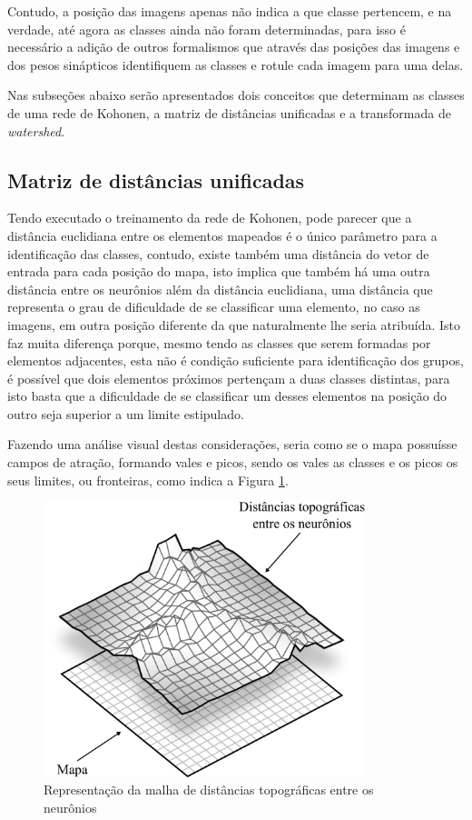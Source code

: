 Contudo, a posição das imagens apenas não indica a que classe pertencem, e na
verdade, até agora as classes ainda não foram determinadas, para isso é
necessário a adição de outros formalismos que através das posições das imagens
e dos pesos sinápticos identifiquem as classes e rotule cada imagem para uma
delas.

Nas subseções abaixo serão apresentados dois conceitos que determinam as classes
de uma rede de Kohonen, a matriz de distâncias unificadas e a transformada de
\textit{watershed}.

\subsection{Matriz de distâncias unificadas}\label{sec:u_matriz}

Tendo executado o treinamento da rede de Kohonen, pode parecer que a distância
euclidiana entre os elementos mapeados é o único parâmetro para a identificação
das classes, contudo, existe também uma distância do vetor de entrada para cada
posição do mapa, isto implica que também há uma outra distância entre os
neurônios além da distância euclidiana, uma distância que representa o grau de
dificuldade de se classificar uma elemento, no caso as imagens, em outra posição
diferente da que naturalmente lhe seria atribuída. Isto faz muita diferença
porque, mesmo tendo as classes que serem formadas por elementos adjacentes, esta
não é condição suficiente para identificação dos grupos, é possível que
dois elementos próximos pertençam a duas classes distintas, para isto basta
que a dificuldade de se classificar um desses elementos na posição do outro seja
superior a um limite estipulado.

Fazendo uma análise visual destas considerações, seria como se o mapa possuísse
campos de atração, formando vales e picos, sendo os vales as classes e os picos
os seus limites, ou fronteiras, como indica a Figura \ref{fig:mapa_x_umatriz}.

\begin{figure}[H]
  \begin{center}
    \includegraphics[height=8cm]{imagens/mapa_x_umatriz.pdf}
  \end{center}
  \caption{ Representação da malha de distâncias topográficas entre os neurônios }
  \label{fig:mapa_x_umatriz}
\end{figure}

